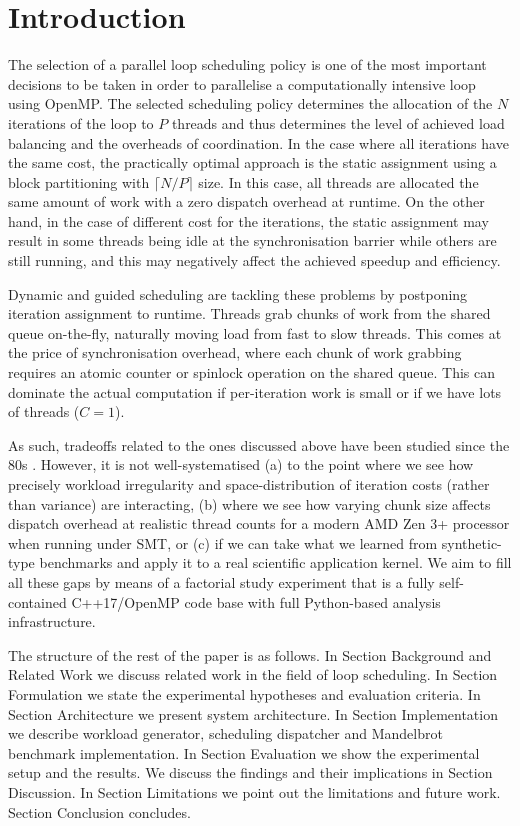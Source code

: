 \documentclass[conference]{IEEEtran}
\begin{document}
\section{Introduction}

The selection of a parallel loop scheduling policy is one of the most important decisions to be taken in order to parallelise a computationally intensive loop using OpenMP. The selected scheduling policy determines the allocation of the \(N\) iterations of the loop to \(P\) threads and thus determines the level of achieved load balancing and the overheads of coordination. In the case where all iterations have the same cost, the practically optimal approach is the static assignment using a block partitioning with \(\lceil N/P\rceil\) size. In this case, all threads are allocated the same amount of work with a zero dispatch overhead at runtime. On the other hand, in the case of different cost for the iterations, the static assignment may result in some threads being idle at the synchronisation barrier while others are still running, and this may negatively affect the achieved speedup and efficiency.

Dynamic and guided scheduling are tackling these problems by postponing iteration assignment to runtime. Threads grab chunks of work from the shared queue on-the-fly, naturally moving load from fast to slow threads. This comes at the price of synchronisation overhead, where each chunk of work grabbing requires an atomic counter or spinlock operation on the shared queue. This can dominate the actual computation if per-iteration work is small or if we have lots of threads (\(C=1\)).

As such, tradeoffs related to the ones discussed above have been studied since the 80s \cite{kruskal1985allocating,polychronopoulos1987guided,tang1986processor}. However, it is not well-systematised (a) to the point where we see how precisely workload irregularity and space-distribution of iteration costs (rather than variance) are interacting, (b) where we see how varying chunk size affects dispatch overhead at realistic thread counts for a modern AMD Zen 3+ processor when running under SMT, or (c) if we can take what we learned from synthetic-type benchmarks and apply it to a real scientific application kernel. We aim to fill all these gaps by means of a factorial study experiment that is a fully self-contained C++17/OpenMP code base with full Python-based analysis infrastructure.

The structure of the rest of the paper is as follows. In Section Background and Related Work we discuss related work in the field of loop scheduling. In Section Formulation we state the experimental hypotheses and evaluation criteria. In Section Architecture we present system architecture. In Section Implementation we describe workload generator, scheduling dispatcher and Mandelbrot benchmark implementation. In Section Evaluation we show the experimental setup and the results. We discuss the findings and their implications in Section Discussion. In Section Limitations we point out the limitations and future work. Section Conclusion concludes.
\end{document}
